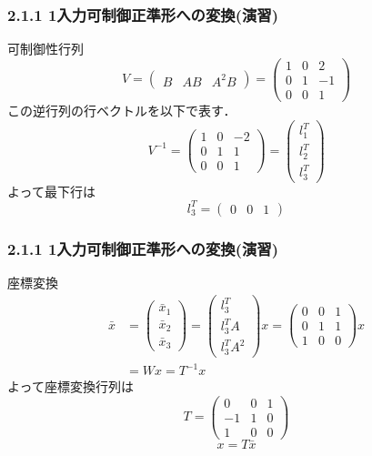 \begin{frame}[t]
\frametitle{2.1.1 1入力可制御正準形への変換(演習)}

可制御性行列
\[
 V = \left(\begin{array}{ccc}
            B & A B & A^2 B
	   \end{array}\right)
   = \left(\begin{array}{ccc}
            1 & 0 & 2 \\
            0 & 1 & -1 \\
            0 & 0 & 1 
	   \end{array}\right)
\]
この逆行列の行ベクトルを以下で表す．
\[
 V^{-1} 
    = \left(\begin{array}{ccc}
            1 & 0 & -2 \\
            0 & 1 & 1 \\
            0 & 0 & 1 
	\end{array}\right)
    = \left(\begin{array}{c}
	     l_1^T \\
	     l_2^T \\
	     l_3^T 
	\end{array}\right)
\]
よって最下行は
\[
 l_3^T
    = \left(\begin{array}{ccc}
            0 & 0 & 1
	\end{array}\right)
\]

\end{frame}


\begin{frame}[t]
\frametitle{2.1.1 1入力可制御正準形への変換(演習)}

座標変換
\begin{align*} 
	\bar{x}
	& =
	\left(\begin{array}{c}
	     \bar{x}_1 \\
	     \bar{x}_2 \\
	     \bar{x}_3 
	\end{array}\right)
	=
	\left(\begin{array}{c}
	     l_3^T  \\
	     l_3^T A  \\
	     l_3^T A^2 
	\end{array}\right)
	x
	=
	\left(\begin{array}{ccc}
	     0 & 0 & 1  \\
	     0 & 1 & 1  \\
	     1 & 0 & 0
	\end{array}\right)
	x
\nonumber \\ &
	= Wx
	= T^{-1}x
\end{align*}
よって座標変換行列は
\[
	T= 
	\left(\begin{array}{ccc}
	     0  & 0 & 1  \\
	     -1 & 1 & 0  \\
	     1  & 0 & 0
	\end{array}\right)
\]
\[
x = T \bar{x}
\]

\end{frame}


